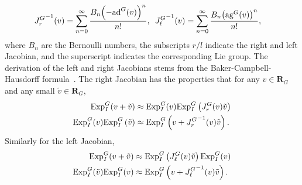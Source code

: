 \begin{align*}
{J_r^{G}}^{-1}(v) & =\sum_{n=0}^{\infty}\frac{B_{n}\mathopen{}\left(-\text{ad}^G(v)\right)^{n}\mathclose{}}{n!},  \hspace{0.5em} {J_\ell^{G}}^{-1}(v)=\sum_{n=0}^{\infty}\frac{B_{n}\mathopen{}\left(\text{ag}^G(v)\right)^{n}\mathclose{}}{n!},
\end{align*}
where $B_{n}$ are the Bernoulli numbers, the subscripts $r/l$ indicate the right and left Jacobian, and the superscript indicates the corresponding Lie group. The derivation of the left
and right Jacobians stems from the Baker-Campbell-Hausdorff formula~\cite{Hall2003,Barfoot2019}. 
The
right Jacobian has the properties that for any $v\in\mathbf{R}_G$ and any small $\tilde{v}\in\mathbf{R}_G$, 
\begin{subequations}\label{eq:Jr_property}
\begin{align}
\text{Exp}_I^{G}(v + \tilde{v}) & \approx\text{Exp}_I^{G}(v)\text{Exp}_I^{G}\left(J_r^G(v)\tilde{v}\right)\\
\text{Exp}_I^{G}(v)\text{Exp}_I^{G}\left(\tilde{v}\right) & \approx\text{Exp}_I^{G}\left(v+{J_r^{G}}^{-1}(v)\tilde{v}\right).
\end{align}
\end{subequations}
%
Similarly for the left Jacobian,
\begin{align*}
\text{Exp}_I^{G}(v+\tilde{v}) & \approx\text{Exp}_I^{G}\left(J_\ell^{G}(v)\tilde{v}\right)\text{Exp}_I^{G}(v)\\
\text{Exp}_I^{G}(\tilde{v})\text{Exp}_I^{G}(v) & \approx\text{Exp}_I^{G}\left(v+{J_\ell^G}^{-1}(v)\tilde{v}\right).
\end{align*}

